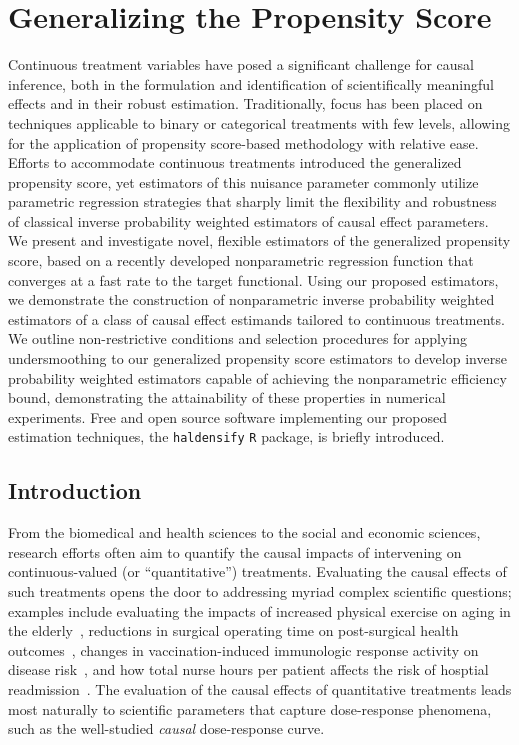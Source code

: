 \chapter{Generalizing the Propensity Score}\label{one}

Continuous treatment variables have posed a significant challenge for causal
inference, both in the formulation and identification of scientifically
meaningful effects and in their robust estimation. Traditionally, focus has been
placed on techniques applicable to binary or categorical treatments with few
levels, allowing for the application of propensity score-based methodology with
relative ease. Efforts to accommodate continuous treatments introduced the
generalized propensity score, yet estimators of this nuisance parameter commonly
utilize parametric regression strategies that sharply limit the flexibility and
robustness of classical inverse probability weighted estimators of causal effect
parameters. We present and investigate novel, flexible estimators of the
generalized propensity score, based on a recently developed nonparametric
regression function that converges at a fast rate to the target functional.
Using our proposed estimators, we demonstrate the construction of nonparametric
inverse probability weighted estimators of a class of causal effect estimands
tailored to continuous treatments. We outline non-restrictive conditions and
selection procedures for applying undersmoothing to our generalized propensity
score estimators to develop inverse probability weighted estimators capable of
achieving the nonparametric efficiency bound, demonstrating the attainability of
these properties in numerical experiments. Free and open source software
implementing our proposed estimation techniques, the \texttt{haldensify}
\texttt{R} package, is briefly introduced.

\section{Introduction}\label{intro}

From the biomedical and health sciences to the social and economic sciences,
research efforts often aim to quantify the causal impacts of intervening on
continuous-valued (or ``quantitative'') treatments. Evaluating the causal
effects of such treatments opens the door to addressing myriad complex
scientific questions; examples include evaluating the impacts of increased
physical exercise on aging in the elderly~\citep{diaz2012population}, reductions
in surgical operating time on post-surgical health
outcomes~\citep{haneuse2013estimation}, changes in vaccination-induced
immunologic response activity on disease risk~\citep{hejazi2020efficient}, and
how total nurse hours per patient affects the risk of hosptial
readmission~\citep{mchugh2013hospitals}. The evaluation of the causal effects of
quantitative treatments leads most naturally to scientific parameters that
capture dose-response phenomena, such as the well-studied \textit{causal}
dose-response curve.

